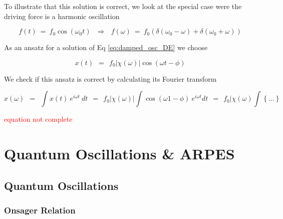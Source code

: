 \documentclass[10pt]{report}
\numberwithin{equation}{chapter}
\newcommand{\refEq}[1]{
  Eq  \ref{#1}
}
\begin{document}


To illustrate that this solution is correct, we look at the special case were the driving force is a harmonic oscillation

\begin{equation}
  f(t) ~=~ f_0 \cos(\omega_0 t) ~~~\Rightarrow~~~ f(\omega) 
  ~=~ f_0 \left( \delta(\omega_0 - \omega) + \delta(\omega_0 + \omega) \right)
\end{equation}


As an ansatz for a solution of \refEq{eq:damped_osc_DE} we choose

\begin{equation}
  x(t) ~~=~~ f_0 | \chi(\omega) | \cos(\omega t - \phi)
\end{equation}


We check if this ansatz is correct by calculating its Fourier transform

\begin{equation}
  x(\omega) ~~=~~ \int x(t)\ e^{i\omega t}\ dt 
  ~~=~~ f_0 |\chi(\omega)| \int \cos(\omega 1 - \phi)\ e^{i\omega t} dt 
  ~~=~~ f_0 | \chi(\omega) \int \left\{... \right\} 
\end{equation}

\textcolor{red}{equation not complete}


%

\chapter{Quantum Oscillations \& ARPES}



%
\section{Quantum Oscillations}

\subsection{Onsager Relation}
\end{document}
